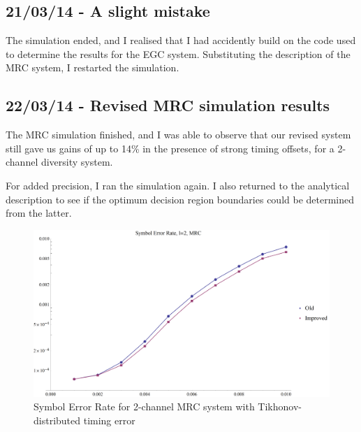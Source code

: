 \subsection{21/03/14 - A slight mistake}

The simulation ended, and I realised that I had accidently build on the
code used to determine the results for the EGC system. Substituting the
description of the MRC system, I restarted the simulation.

\subsection{22/03/14 - Revised MRC simulation results}

The MRC simulation finished, and I was able to observe that our revised
system still gave us gains of up to 14\% in the presence of strong
timing offsets, for a 2-channel diversity system.

For added precision, I ran the simulation again. I also returned to the
analytical description to see if the optimum decision region boundaries
could be determined from the latter.

\begin{figure}[htbp]
\centering
\includegraphics{../plots/MRC_SER.png}
\caption{Symbol Error Rate for 2-channel MRC system with
Tikhonov-distributed timing error}
\end{figure}
